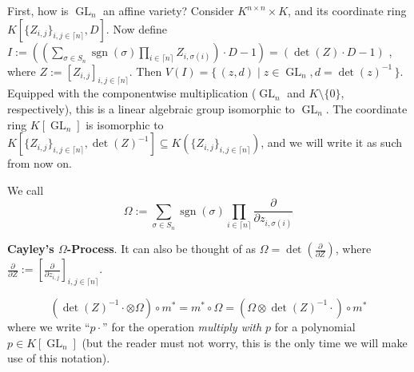 First, how is $\operatorname{GL}_n$ an affine variety?
Consider $ K^{n \times n} \times K $, and its coordinate ring $ K\left\lbrack \lbrace Z_{i,j} \rbrace_{i,j \in \lceil n \rceil} , D \right\rbrack$.
Now define $ I := \left( \left( \sum_{\sigma \in S_n} \operatorname{sgn} \left( \sigma \right) \prod_{ i \in \lceil n \rceil } Z_{i, \sigma \left( i \right) } \right) \cdot D - 1 \right)  = \left( \operatorname{det} \left( Z \right) \cdot D - 1 \right) $ , where $ Z := \left\lbrack Z_{i,j} \right\rbrack_{i,j \in \lceil n \rceil} $.
Then $ V \left( I \right) = \lbrace \, \left( z , d \right) \mid z \in \operatorname{GL}_n , d = \operatorname{det} \left( z \right)^{-1} \, \rbrace $.
Equipped with the componentwise multiplication ($\operatorname{GL}_n$ and $K \setminus \lbrace 0 \rbrace$, respectively), this is a linear algebraic group isomorphic to $\operatorname{GL}_n$.
The coordinate ring $K\left\lbrack \operatorname{GL}_n\right\rbrack$ is isomorphic to $K \left\lbrack \lbrace Z_{i,j} \rbrace_{i,j \in \lceil n \rceil} , \operatorname{det} \left( Z \right)^{-1} \right\rbrack \subseteq K \left( \lbrace Z_{i,j} \rbrace_{i,j \in \lceil n \rceil} \right) $, and we will write it as such from now on.
\begin{definition}
  We call
  \begin{equation}
    \Omega := \sum_{\sigma \in S_n} \operatorname{sgn} \left( \sigma \right) \prod_{ i \in \lceil n \rceil } \frac{\partial}{\partial z_{i , \sigma \left( i \right)}}
  \end{equation}
\end{definition}
\textbf{Cayley's $\Omega$-Process}.
It can also be thought of as $ \Omega = \operatorname{det} \left( \frac{\partial}{\partial Z} \right) $, where $\frac{\partial}{\partial Z} := \left\lbrack \frac{\partial}{\partial z_{i,j}} \right\rbrack_{i,j \in \lceil n \rceil} $.

\begin{lemma}
  \begin{equation}
    \left( \operatorname{det} \left( Z \right) ^{-1} \cdot \otimes \Omega \right) \circ m^\ast
    = m^\ast \circ \Omega
    = \left( \Omega \otimes \operatorname{det} \left( Z \right) ^{-1} \cdot \right) \circ m^\ast
  \end{equation}
  where we write ``$ p \cdot $'' for the operation \textit{multiply with $ p $} for a polynomial $ p \in K \left\lbrack \operatorname{GL}_n \right\rbrack $ (but the reader must not worry, this is the only time we will make use of this notation).
\end{lemma}

